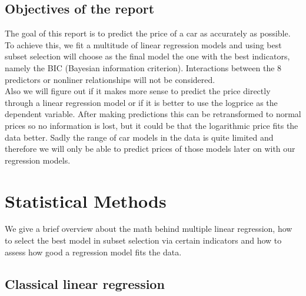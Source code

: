 \documentclass[12 pt]{scrartcl}
\begin{document}
\subsection{Objectives of the report}
The goal of this report is to predict the price of a car as accurately as possible. To achieve this, we fit a multitude of linear regression models and using best subset selection will choose as the final model the one with the best indicators, namely the BIC (Bayesian information criterion). Interactions between the 8 predictors or nonliner relationships will not be considered. \\
Also we will figure out if it makes more sense to predict the price directly through a linear regression model or if it is better to use the logprice as the dependent variable. After making predictions this can be retransformed to normal prices so no information is lost, but it could be that the logarithmic price fits the data better.
Sadly the range of car models in the data is quite limited and therefore we will only be able to predict prices of those models later on with our regression models.

\section{Statistical Methods}

We give a brief overview about the math behind multiple linear regression, how to select the best model in subset selection via certain indicators and how to assess how good a regression model fits the data.

\subsection{Classical linear regression}
\end{document}
